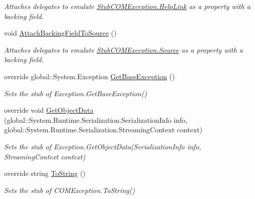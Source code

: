 \begin{DoxyCompactItemize}
\begin{DoxyCompactList}\small\item\em Attaches delegates to emulate \hyperlink{class_system_1_1_runtime_1_1_interop_services_1_1_fakes_1_1_stub_c_o_m_exception_ade99c7829722ce499160201736bbfed8}{Stub\-C\-O\-M\-Exception.\-Help\-Link} as a property with a backing field.\end{DoxyCompactList}\item 
void \hyperlink{class_system_1_1_runtime_1_1_interop_services_1_1_fakes_1_1_stub_c_o_m_exception_ac24f9684dd496bf29145787d7973f1b0}{Attach\-Backing\-Field\-To\-Source} ()
\begin{DoxyCompactList}\small\item\em Attaches delegates to emulate \hyperlink{class_system_1_1_runtime_1_1_interop_services_1_1_fakes_1_1_stub_c_o_m_exception_a6d206a4389618e6d53ee52db095c06f0}{Stub\-C\-O\-M\-Exception.\-Source} as a property with a backing field.\end{DoxyCompactList}\item 
override global\-::\-System.\-Exception \hyperlink{class_system_1_1_runtime_1_1_interop_services_1_1_fakes_1_1_stub_c_o_m_exception_a9cfafeed295ea5b1256b7f12c78cd332}{Get\-Base\-Exception} ()
\begin{DoxyCompactList}\small\item\em Sets the stub of Exception.\-Get\-Base\-Exception()\end{DoxyCompactList}\item 
override void \hyperlink{class_system_1_1_runtime_1_1_interop_services_1_1_fakes_1_1_stub_c_o_m_exception_a5a12c5e3bda9033445d4f47d3e720f18}{Get\-Object\-Data} (global\-::\-System.\-Runtime.\-Serialization.\-Serialization\-Info info, global\-::\-System.\-Runtime.\-Serialization.\-Streaming\-Context context)
\begin{DoxyCompactList}\small\item\em Sets the stub of Exception.\-Get\-Object\-Data(\-Serialization\-Info info, Streaming\-Context context)\end{DoxyCompactList}\item 
override string \hyperlink{class_system_1_1_runtime_1_1_interop_services_1_1_fakes_1_1_stub_c_o_m_exception_a51ff4281e6e5c6f10bfbb1cf266242c5}{To\-String} ()
\begin{DoxyCompactList}\small\item\em Sets the stub of C\-O\-M\-Exception.\-To\-String()\end{DoxyCompactList}\end{DoxyCompactItemize}
